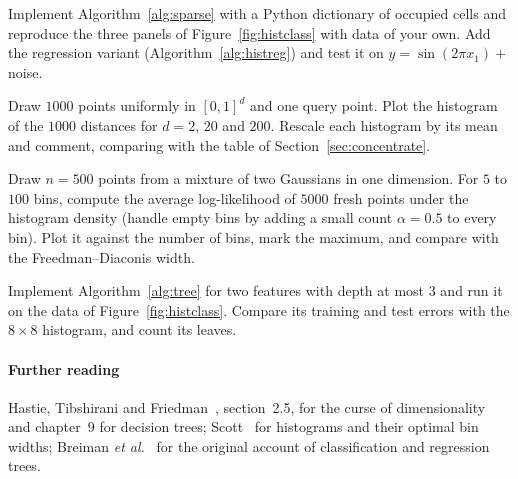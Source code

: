 \documentclass[11pt]{article}
\begin{document}
\begin{questions}
\begin{programming}
\item Implement Algorithm~\ref{alg:sparse} with a Python dictionary of occupied cells and reproduce the three panels of
Figure~\ref{fig:histclass} with data of your own. Add the regression variant (Algorithm~\ref{alg:histreg}) and test it
on $y = \sin(2\pi x_1) +$ noise.
\item Draw $1000$ points uniformly in $[0,1]^d$ and one query point. Plot the histogram of the $1000$ distances for
$d = 2$, $20$ and $200$. Rescale each histogram by its mean and comment, comparing with the table of
Section~\ref{sec:concentrate}.
\item Draw $n = 500$ points from a mixture of two Gaussians in one dimension. For $5$ to $100$ bins, compute the
average log-likelihood of $5000$ fresh points under the histogram density (handle empty bins by adding a small count
$\alpha = 0.5$ to every bin). Plot it against the number of bins, mark the maximum, and compare with the
Freedman--Diaconis width.
\item Implement Algorithm~\ref{alg:tree} for two features with depth at most 3 and run it on the data of
Figure~\ref{fig:histclass}. Compare its training and test errors with the $8 \times 8$ histogram, and count its
leaves.
\end{programming}
\end{questions}

\paragraph{Further reading} Hastie, Tibshirani and Friedman~\cite{hastie2009}, section~2.5, for the curse of
dimensionality and chapter~9 for decision trees; Scott~\cite{scott2015} for histograms and their optimal bin widths;
Breiman \emph{et al.}~\cite{breiman1984} for the original account of classification and regression trees.
\end{document}

